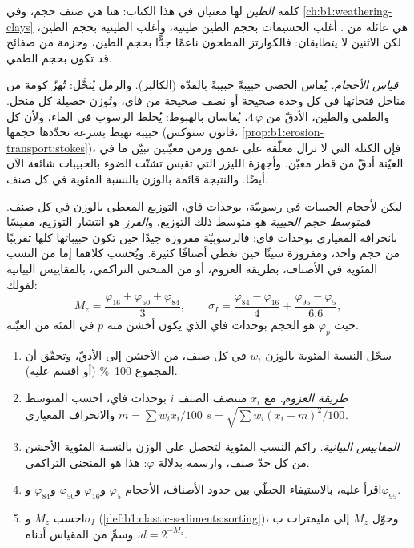 كلمة \emph{الطين} لها معنيان في هذا الكتاب: هنا هي صنف حجم، وفي \cref{ch:b1:weathering-clays} هي عائلة من . أغلب الجسيمات بحجم الطين  طينية، وأغلب  الطينية بحجم الطين، لكن الاثنين لا يتطابقان: فالكوارتز المطحون ناعمًا جدًّا بحجم الطين، وحزمة من صفائح  قد تكون بحجم الطمي.

\emph{قياس الأحجام.} يُقاس الحصى حبيبةً حبيبةً بالقدّة (الكالبر). والرمل يُنخَّل: تُهزّ كومة من مناخل فتحاتها في كل وحدة صحيحة أو نصف صحيحة من فاي، وتُوزن حصيلة كل منخل. والطمي والطين، الأدقّ من $4\,\varphi$، يُقاسان بالهبوط: يُخلط الرسوب في الماء، ولأن كل حبيبة تهبط بسرعة تحدّدها حجمها (قانون ستوكس، \cref{prop:b1:erosion-transport:stokes})، فإن الكتلة التي لا تزال معلّقة على عمق وزمن معيّنين تبيّن ما في العيّنة أدقّ من قطر معيّن. وأجهزة الليزر التي تقيس تشتّت الضوء بالحبيبات شائعة الآن أيضًا. والنتيجة قائمة بالوزن بالنسبة المئوية في كل صنف.

\begin{definition}\label{def:b1:clastic-sediments:sorting}
ليكن لأحجام الحبيبات في رسوبيّة، بوحدات فاي، التوزيع المعطى بالوزن في كل صنف. ف\emph{متوسط حجم الحبيبة} هو متوسط ذلك التوزيع، و\emph{الفرز} هو انتشار التوزيع، مقيسًا بانحرافه المعياري بوحدات فاي: فالرسوبيّة مفروزة جيدًا حين تكون حبيباتها كلها تقريبًا من حجم واحد، ومفروزة سيئًا حين تغطي أصنافًا كثيرة. ويُحسب كلاهما إما من النسب المئوية في الأصناف، بطريقة العزوم، أو من المنحنى التراكمي، بالمقاييس البيانية لفولك:
\[
  M_z = \frac{\varphi_{16} + \varphi_{50} + \varphi_{84}}{3}, \qquad
  \sigma_I = \frac{\varphi_{84} - \varphi_{16}}{4} + \frac{\varphi_{95} - \varphi_{5}}{6.6},
\]
حيث $\varphi_p$ هو الحجم بوحدات فاي الذي يكون أخشن منه $p$ في المئة من العيّنة.
\end{definition}

\begin{method}\label{met:b1:clastic-sediments:graphic}
\begin{enumerate}
  \item سجّل النسبة المئوية بالوزن $w_i$ في كل صنف، من الأخشن إلى الأدقّ، وتحقّق أن المجموع \qty{100}{\percent} (أو اقسم عليه).
  \item \emph{طريقة العزوم.} مع $x_i$ منتصف الصنف $i$ بوحدات فاي، احسب المتوسط $m = \sum w_i x_i / 100$ والانحراف المعياري $s = \sqrt{\sum w_i (x_i - m)^2 / 100}$.
  \item \emph{المقاييس البيانية.} راكم النسب المئوية لتحصل على الوزن بالنسبة المئوية الأخشن من كل حدّ صنف، وارسمه بدلالة $\varphi$: هذا هو المنحنى التراكمي.
  \item اقرأ عليه، بالاستيفاء الخطّي بين حدود الأصناف، الأحجام $\varphi_5$ و$\varphi_{16}$ و$\varphi_{50}$ و$\varphi_{84}$ و$\varphi_{95}$.
  \item احسب $M_z$ و$\sigma_I$ (\cref{def:b1:clastic-sediments:sorting})، وحوّل $M_z$ إلى مليمترات ب$d = 2^{-M_z}$، وسمِّ  من المقياس أدناه.
\end{enumerate}
\end{method}

